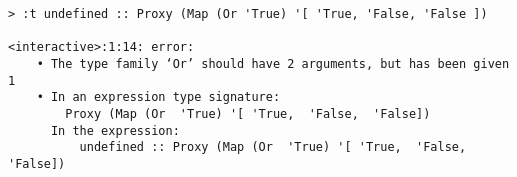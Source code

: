\begin{repl}\begin{lstlisting}
> :t undefined :: Proxy (Map (Or 'True) '[ 'True, 'False, 'False ])

<interactive>:1:14: error:
    • The type family ‘Or’ should have 2 arguments, but has been given 1
    • In an expression type signature:
        Proxy (Map (Or  'True) '[ 'True,  'False,  'False])
      In the expression:
          undefined :: Proxy (Map (Or  'True) '[ 'True,  'False,  'False])\end{lstlisting}\end{repl}
